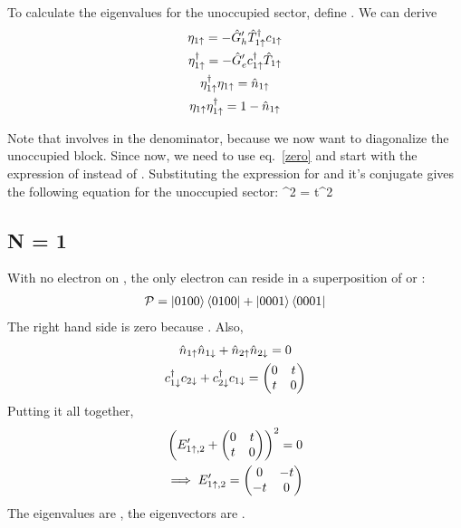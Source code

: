 \documentclass[12pt]{article}
\begin{document}
\subsection{}
To calculate the eigenvalues for the unoccupied sector, define . We can derive
\begin{gather}
    \eta_{1\uparrow} = -\hat G_h^\prime \hat T_{1\uparrow}^\dagger c_{1\uparrow}\label{now} \\
        \eta^\dagger_{1\uparrow} = -\hat G_e^\prime c_{1\uparrow}^\dagger\hat T_{1\uparrow}\label{etad2}\\
        \eta^\dagger_{1\uparrow}\eta_{1\uparrow}=\hat n_{1\uparrow} \\
        \eta_{1\uparrow}\eta^\dagger_{1\uparrow}=1-\hat n_{1\uparrow}\label{zero}
\end{gather}

Note that  involves  in the denominator, because we now want to diagonalize the unoccupied block. Since  now, we need to use eq.~\ref{zero} and start with the expression of  instead of \il{\eta^\dagger_{1\ua}}. Substituting the expression for \il{\eta_{1\ua}} and it's conjugate gives the following equation for the unoccupied sector:
\beq
{}^2 = t^2 \nc
\eeq

\subsection{N = 1}

With no electron on , the only electron can reside in a superposition of  or :
\begin{gather}
    \mathcal{P} = \ket{0100}\bra{0100} + \ket{0001}\bra{0001}
\end{gather}
The right hand side is zero because . Also,
\begin{gather}
    \hat n_{1\uparrow}\hat n_{1\downarrow}+\hat n_{2\uparrow}\hat n_{2\downarrow} = 0\\
    c_{1\downarrow}^\dagger c_{2\downarrow}+c_{2\downarrow}^\dagger c_{1\downarrow} = \begin{pmatrix} 0 & t \\ t & 0 \end{pmatrix}
\end{gather}
Putting it all together,
\begin{gather}
    \left({E^\prime_{1\uparrow,2}+ \begin{pmatrix} 0 & t \\ t & 0 \end{pmatrix}}\right)^2 = 0 \\
    \implies E^\prime_{1\uparrow,2}= \begin{pmatrix} 0 & -t \\ -t & 0 \end{pmatrix}\label{eval}
\end{gather}
The eigenvalues are , the eigenvectors are . 
\end{document}
